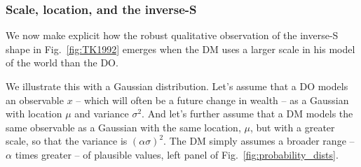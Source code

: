 \documentclass[a4paper, 12pt]{article}
\newcommand{\fref}[1]{Fig.~\ref{fig:#1}}
\newcommand{\secref}[1]{Sec.~\ref{sec:#1}}
\begin{document}
\subsubsection{Scale, location, and the inverse-S}
We now make explicit how the robust qualitative observation of the inverse-S shape in \fref{TK1992} emerges when the DM uses a larger scale in his model of the world than the DO. 

We illustrate this with a Gaussian distribution.
Let's assume that a DO models an observable $x$ -- which will often be a future change in wealth -- as a Gaussian with location $\mu$ and variance $\sigma^2$. And let's further assume that a DM 
models the same observable as a Gaussian with the same location, $\mu$, but with a greater scale, so that the variance is $(\alpha\sigma)^2$. The DM simply assumes a broader range -- $\alpha$ times greater -- of plausible values, left panel of \fref{probability_dists}.
\end{document}

